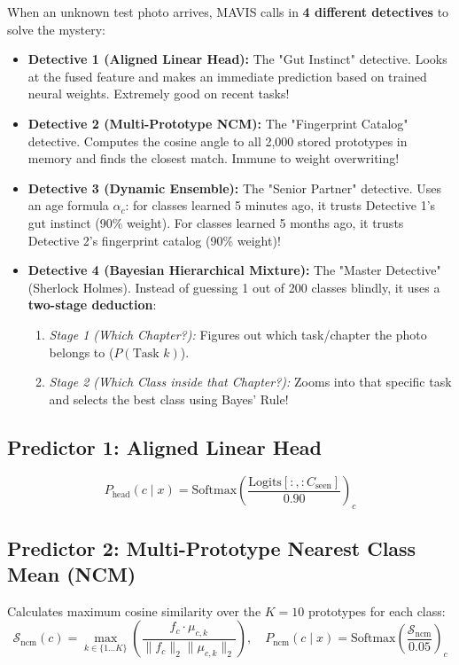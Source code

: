 \documentclass[11pt,a4paper]{article}
\begin{document}
\begin{callout}
When an unknown test photo arrives, MAVIS calls in \textbf{4 different detectives} to solve the mystery:
\begin{itemize}[leftmargin=*]
    \item \textbf{Detective 1 (Aligned Linear Head):} The "Gut Instinct" detective. Looks at the fused feature and makes an immediate prediction based on trained neural weights. Extremely good on recent tasks!
    \item \textbf{Detective 2 (Multi-Prototype NCM):} The "Fingerprint Catalog" detective. Computes the cosine angle to all 2,000 stored prototypes in memory and finds the closest match. Immune to weight overwriting!
    \item \textbf{Detective 3 (Dynamic Ensemble):} The "Senior Partner" detective. Uses an age formula $\alpha_c$: for classes learned 5 minutes ago, it trusts Detective 1's gut instinct (90\% weight). For classes learned 5 months ago, it trusts Detective 2's fingerprint catalog (90\% weight)!
    \item \textbf{Detective 4 (Bayesian Hierarchical Mixture):} The "Master Detective" (Sherlock Holmes). Instead of guessing 1 out of 200 classes blindly, it uses a \textbf{two-stage deduction}:
    \begin{enumerate}[noitemsep]
        \item \textit{Stage 1 (Which Chapter?):} Figures out which task/chapter the photo belongs to ($P(\text{Task } k)$).
        \item \textit{Stage 2 (Which Class inside that Chapter?):} Zooms into that specific task and selects the best class using Bayes' Rule!
    \end{enumerate}
\end{itemize}
\end{callout}

\subsection{Predictor 1: Aligned Linear Head}
\begin{equation}
P_{\text{head}}(c \mid x) = \text{Softmax}\left(\frac{\text{Logits}[:, :C_{\text{seen}}]}{0.90}\right)_c
\end{equation}

\subsection{Predictor 2: Multi-Prototype Nearest Class Mean (NCM)}
Calculates maximum cosine similarity over the $K=10$ prototypes for each class:
\begin{equation}
\mathcal{S}_{\text{ncm}}(c) = \max_{k \in \{1 \dots K\}} \left( \frac{f_c \cdot \mu_{c, k}}{\|f_c\|_2 \|\mu_{c, k}\|_2} \right), \quad P_{\text{ncm}}(c \mid x) = \text{Softmax}\left(\frac{\mathcal{S}_{\text{ncm}}}{0.05}\right)_c
\end{equation}
\end{document}
